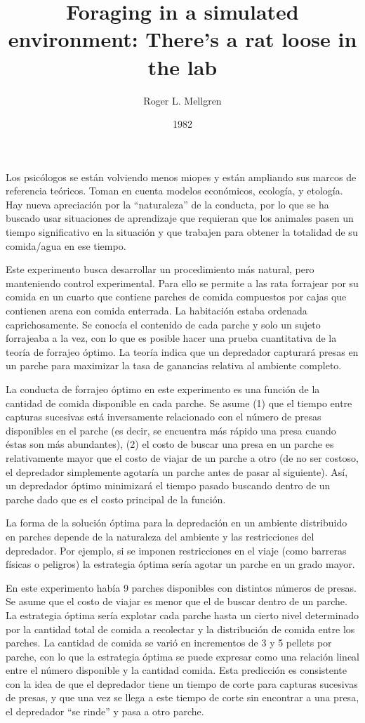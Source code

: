\documentclass[a4paper,12pt]{article}
\title{Foraging in a simulated environment: There's a rat loose in the lab}
\author{Roger L. Mellgren}
\date{1982}
\begin{document}
{\scshape\bfseries \maketitle}

Los psicólogos se están volviendo menos miopes y están ampliando sus marcos de referencia teóricos. Toman en cuenta modelos económicos, ecología, y etología. Hay nueva apreciación por la ``naturaleza'' de la conducta, por lo que se ha buscado usar situaciones de aprendizaje que requieran que los animales pasen un tiempo significativo en la situación y que trabajen para obtener la totalidad de su comida/agua en ese tiempo.

Este experimento busca desarrollar un procedimiento más natural, pero manteniendo control experimental. Para ello se permite a las rata forrajear por su comida en un cuarto que contiene parches de comida compuestos por cajas que contienen arena con comida enterrada. La habitación estaba ordenada caprichosamente. Se conocía el contenido de cada parche y solo un sujeto forrajeaba a la vez, con lo que es posible hacer una prueba cuantitativa de la teoría de forrajeo óptimo. La teoría indica que un depredador capturará presas en un parche para maximizar la tasa de ganancias relativa al ambiente completo.

La conducta de forrajeo óptimo en este experimento es una función de la cantidad de comida disponible en cada parche. Se asume (1) que el tiempo entre capturas sucesivas está inversamente relacionado con el número de presas disponibles en el parche (es decir, se encuentra más rápido una presa cuando éstas son más abundantes), (2) el costo de buscar una presa en un parche es relativamente mayor que el costo de viajar de un parche a otro (de no ser costoso, el depredador simplemente agotaría un parche antes de pasar al siguiente). Así, un depredador óptimo minimizará el tiempo pasado buscando dentro de un parche dado que es el costo principal de la función. 

La forma de la solución óptima para la depredación en un ambiente distribuido en parches depende de la naturaleza del ambiente y las restricciones del depredador. Por ejemplo, si se imponen restricciones en el viaje (como barreras físicas o peligros) la estrategia óptima sería agotar un parche en un grado mayor.

En este experimento había 9 parches disponibles con distintos números de presas. Se asume que el costo de viajar es menor que el de buscar dentro de un parche. La estrategia óptima sería explotar cada parche hasta un cierto nivel determinado por la cantidad total de comida a recolectar y la distribución de comida entre los parches. La cantidad de comida se varió en incrementos de 3 y 5 pellets por parche, con lo que la estrategia óptima se puede expresar como una relación lineal entre el número disponible y la cantidad comida. Esta predicción es consistente con la idea de que el depredador tiene un tiempo de corte para capturas sucesivas de presas, y que una vez se llega a este tiempo de corte sin encontrar a una presa, el depredador ``se rinde'' y pasa a otro parche.
\end{document}
